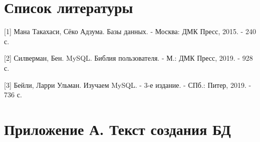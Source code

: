 \documentclass[11pt,a4paper,final]{article} %
\begin{document}
\section*{Список литературы}

[1] Мана Такахаси, Сёко Адзума. Базы данных. - Москва: ДМК Пресс, 2015. - 240 с.

[2] Силверман, Бен. MySQL. Библия пользователя. - М.: ДМК Пресс, 2019. - 928 с.

[3] Бейли, Ларри Ульман. Изучаем MySQL. - 3-е издание. - СПб.: Питер, 2019. - 736 с.

\newpage

\section*{Приложение А. Текст создания БД}	
\label{sec:appendixA}
\end{document}
